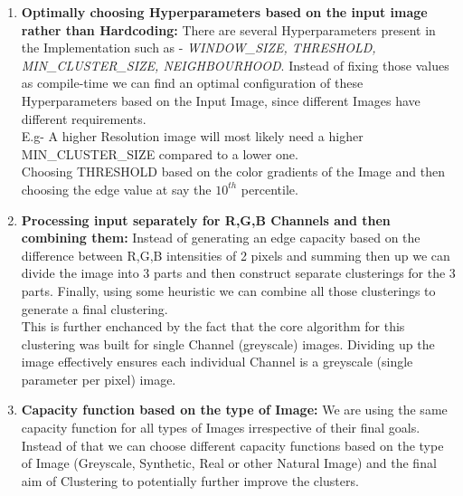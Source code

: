             \begin{enumerate}
                \item {
                    \textbf{Optimally choosing Hyperparameters based on the input image rather than Hardcoding:} There are several Hyperparameters present in the Implementation such as - \textit{WINDOW\_SIZE, THRESHOLD, MIN\_CLUSTER\_SIZE, NEIGHBOURHOOD}. Instead of fixing those values as compile-time we can find an optimal configuration of these Hyperparameters based on the Input Image, since different Images have different requirements. \\
                    E.g- A higher Resolution image will most likely need a higher MIN\_CLUSTER\_SIZE compared to a lower one. \\
                    Choosing THRESHOLD based on the color gradients of the Image and then choosing the edge value at say the $10^{th}$ percentile.
                }
                \item {
                    \textbf{Processing input separately for R,G,B Channels and then combining them:} Instead of generating an edge capacity based on the difference between R,G,B intensities of 2 pixels and summing then up we can divide the image into 3 parts and then construct separate clusterings for the 3 parts. Finally, using some heuristic we can combine all those clusterings to generate a final clustering. \\
                    This is further enchanced by the fact that the core algorithm for this clustering was built for single Channel (greyscale) images. Dividing up the image effectively ensures each individual Channel is a greyscale (single parameter per pixel) image.
                }
                \item {
                    \textbf{Capacity function based on the type of Image:} We are using the same capacity function for all types of Images irrespective of their final goals. \\
                    Instead of that we can choose different capacity functions based on the type of Image (Greyscale, Synthetic, Real or other Natural Image) and the final aim of Clustering to potentially further improve the clusters.
                }
            \end{enumerate}


